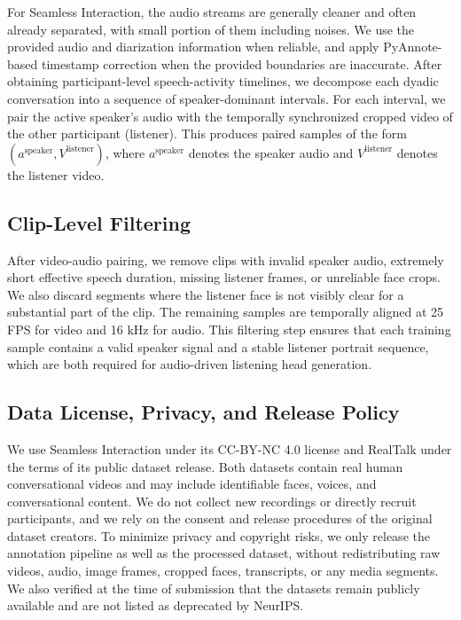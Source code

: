 For Seamless Interaction, the audio streams are generally cleaner and often already separated, with small portion of them including noises. We use the provided audio and diarization information when reliable, and apply PyAnnote-based timestamp correction when the provided boundaries are inaccurate. After obtaining participant-level speech-activity timelines, we decompose each dyadic conversation into a sequence of speaker-dominant intervals. For each interval, we pair the active speaker's audio with the temporally synchronized cropped video of the other participant (listener). This produces paired samples of the form $(a^{\text{speaker}}, V^{\text{listener}})$, where $a^{\text{speaker}}$ denotes the speaker audio and $V^{\text{listener}}$ denotes the listener video.

\subsection{Clip-Level Filtering}
\label{app:clip_filtering}

After video-audio pairing, we remove clips with invalid speaker audio, extremely short effective speech duration, missing listener frames, or unreliable face crops. We also discard segments where the listener face is not visibly clear for a substantial part of the clip. The remaining samples are temporally aligned at 25 FPS for video and 16 kHz for audio. This filtering step ensures that each training sample contains a valid speaker signal and a stable listener portrait sequence, which are both required for audio-driven listening head generation.

\subsection{Data License, Privacy, and Release Policy}
We use Seamless Interaction under its CC-BY-NC 4.0 license and RealTalk under the terms of its public dataset release. Both datasets contain real human conversational videos and may include identifiable faces, voices, and conversational content. We do not collect new recordings or directly recruit participants, and we rely on the consent and release procedures of the original dataset creators. To minimize privacy and copyright risks, we only release the annotation pipeline as well as the processed dataset, without redistributing raw videos, audio, image frames, cropped faces, transcripts, or any media segments. We also verified at the time of submission that the datasets remain publicly available and are not listed as deprecated by NeurIPS.



